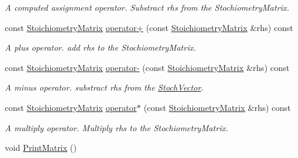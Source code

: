 \begin{CompactItemize}
\begin{CompactList}\small\item\em A computed assignment operator. Substract rhs from the StochiometryMatrix. \item\end{CompactList}\item 
\hypertarget{class_stoichiometry_matrix_970590ef4398c1d6479dda7e8c4a398f}{
const \hyperlink{class_stoichiometry_matrix}{StoichiometryMatrix} \hyperlink{class_stoichiometry_matrix_970590ef4398c1d6479dda7e8c4a398f}{operator+} (const \hyperlink{class_stoichiometry_matrix}{StoichiometryMatrix} \&rhs) const }
\label{class_stoichiometry_matrix_970590ef4398c1d6479dda7e8c4a398f}

\begin{CompactList}\small\item\em A plus operator. add rhs to the StochiometryMatrix. \item\end{CompactList}\item 
\hypertarget{class_stoichiometry_matrix_eed9851c2815187dcc5ea0485cb57b21}{
const \hyperlink{class_stoichiometry_matrix}{StoichiometryMatrix} \hyperlink{class_stoichiometry_matrix_eed9851c2815187dcc5ea0485cb57b21}{operator-} (const \hyperlink{class_stoichiometry_matrix}{StoichiometryMatrix} \&rhs) const }
\label{class_stoichiometry_matrix_eed9851c2815187dcc5ea0485cb57b21}

\begin{CompactList}\small\item\em A minus operator. substract rhs from the \hyperlink{class_stoch_vector}{StochVector}. \item\end{CompactList}\item 
\hypertarget{class_stoichiometry_matrix_2cfa576df97b23be2753884f7aa00307}{
const \hyperlink{class_stoichiometry_matrix}{StoichiometryMatrix} \hyperlink{class_stoichiometry_matrix_2cfa576df97b23be2753884f7aa00307}{operator$\ast$} (const \hyperlink{class_stoichiometry_matrix}{StoichiometryMatrix} \&rhs) const }
\label{class_stoichiometry_matrix_2cfa576df97b23be2753884f7aa00307}

\begin{CompactList}\small\item\em A multiply operator. Multiply rhs to the StochiometryMatrix. \item\end{CompactList}\item 
\hypertarget{class_stoichiometry_matrix_ddacab7b3448e8dbfdbb0e1214b6581f}{
void \hyperlink{class_stoichiometry_matrix_ddacab7b3448e8dbfdbb0e1214b6581f}{PrintMatrix} ()}
\label{class_stoichiometry_matrix_ddacab7b3448e8dbfdbb0e1214b6581f}


\end{CompactItemize}
